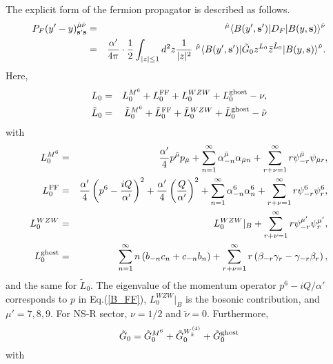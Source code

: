 \documentclass[a4paper,prd,preprint]{revtex4}
\begin{document}
The explicit form of the fermion propagator is described as follows.
\begin{eqnarray}
 P_F(y'-y)_{{\bf s}'{\bf s}}^{{\hat \mu}{\hat \nu}} &=& 
 {}^{\hat \mu}\langle B(y',{\bf s}') |
  D_F | B(y,{\bf s}) \rangle^{\hat \nu}
\nonumber\\
 &=& {{\alpha'} \over {4\pi}} \cdot {1 \over 2}
     \int_{|z| \le 1} d^2 z {1 \over {|z|^2}} \
     {}^{\hat \mu}\langle B(y',{\bf s}') |
      {\tilde G}_0 z^{L_0} {\bar z}^{{\tilde L}_0}
     | B(y,{\bf s}) \rangle^{\hat \nu}.
\label{propagator1}
\end{eqnarray}
Here,
\begin{eqnarray}
 L_0 &=& L_0^{M^6} + L_0^{\rm FF} + L_0^{WZW} + L_0^{\rm ghost}
         - \nu,
\\
 {\tilde L}_0
  &=& {\tilde L}_0^{M^6} + {\tilde L}_0^{\rm FF}
    + {\tilde L}_0^{WZW} + {\tilde L}_0^{\rm ghost}
    - {\tilde \nu}
\end{eqnarray}
 with
\begin{eqnarray}
 L_0^{M^6} &=&
  {{\alpha'} \over 4} p^{\bar \mu} p_{\bar \mu}
  + \sum_{n=1}^\infty \alpha_{-n}^{\bar \mu} \alpha_{{\bar \mu} n}
  + \sum_{r+\nu=1}^\infty r \psi_{-r}^{\bar \mu} \psi_{{\bar \mu} r},
\\
 L_0^{\rm FF} &=&
  {{\alpha'} \over 4} \left( p^6 - {{iQ} \over {\alpha'}} \right)^2
  + {{\alpha'} \over 4} \left( {Q \over {\alpha'}} \right)^2
  + \sum_{n=1}^\infty \alpha^6_{-n} \alpha^6_n
  + \sum_{r+\nu=1}^\infty r \psi_{-r}^6 \psi_r^6,
\\
 L_0^{WZW} &=&
  L_0^{WZW}\vert_B
  + \sum_{r+\nu=1}^\infty r \psi_{-r}^{\mu'} \psi_r^{\mu'},
\\
 L_0^{\rm ghost} &=&
  \sum_{n=1}^\infty
   n \left( b_{-n} c_n + c_{-n} b_n \right)
  + \sum_{r+\nu=1}^\infty
   r \left( \beta_{-r} \gamma_r - \gamma_{-r} \beta_r \right),
\end{eqnarray}
 and the same for ${\tilde L}_0$.
The eigenvalue of the momentum operator $p^6-iQ/\alpha'$
 corresponds to $p$ in Eq.(\ref{B_FF}),
 $L_0^{WZW}\vert_B$ is the bosonic contribution,
 and $\mu'=7,8,9$.
For NS-R sector, $\nu=1/2$ and ${\tilde \nu}=0$.
Furthermore,
\begin{equation}
 {\tilde G}_0
 = {\tilde G}_0^{M^6} + {\tilde G}_0^{W^{(4)}_k} 
 + {\tilde G}_0^{\rm ghost}
\end{equation}
 with
\end{document}
